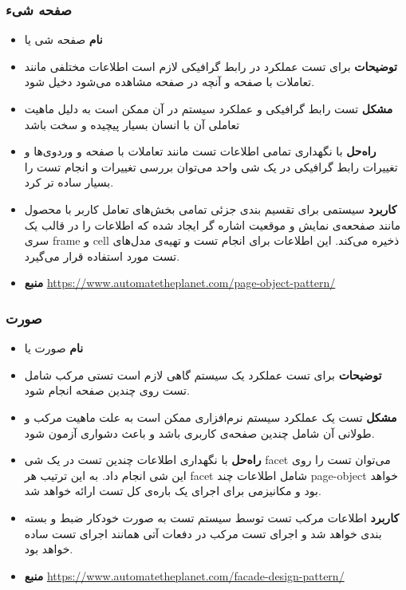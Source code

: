\subsubsection{صفحه شیء}
\begin{itemize}
\item \textbf{نام} \newline
صفحه شی یا 
\item \textbf{توضیحات} \newline
برای تست عملکرد در رابط گرافیکی لازم است اطلاعات مختلفی مانند تعاملات با صفحه و آنچه در صفحه مشاهده می‌شود دخیل شود.
\item \textbf{مشکل} \newline
تست رابط گرافیکی و عملکرد سیستم در آن ممکن است به دلیل ماهیت تعاملی آن با انسان بسیار پیچیده و سخت باشد
\item \textbf{راه‌حل} \newline
با نگهداری تمامی اطلاعات تست مانند تعاملات با صفحه و وردوی‌ها و تغییرات رابط گرافیکی در یک شی واحد می‌توان بررسی تغییرات و انجام تست را بسیار ساده تر کرد.
\item \textbf{کاربرد} \newline
سیستمی برای تقسیم بندی جزئی تمامی بخش‌های تعامل کاربر با محصول مانند صفحعه‌ی نمایش و موقعیت اشاره گر ایجاد شده که اطلاعات را در قالب یک سری frame و cell ذخیره می‌کند. این اطلاعات برای انجام تست و تهیه‌ی مدل‌های تست مورد استفاده قرار می‌گیرد.
\item \textbf{منبع} \newline
\url{https://www.automatetheplanet.com/page-object-pattern/}
\end{itemize}


\subsubsection{صورت}
\begin{itemize}
\item \textbf{نام} \newline
صورت یا 
\item \textbf{توضیحات} \newline
برای تست عملکرد یک سیستم گاهی لازم است تستی مرکب شامل تست روی چندین صفحه انجام شود.
\item \textbf{مشکل} \newline
تست یک عملکرد سیستم نرم‌افزاری ممکن است به علت ماهیت مرکب و طولانی آن شامل چندین صفحه‌ی کاربری باشد و باعث دشواری آزمون شود.
\item \textbf{راه‌حل} \newline
با نگهداری اطلاعات چندین تست در یک شی facet می‌توان تست را روی این شی انجام داد. به این ترتیب هر facet شامل اطلاعات چند page-object خواهد بود و مکانیزمی برای اجرای یک باره‌ی کل تست ارائه خواهد شد.
\item \textbf{کاربرد} \newline
اطلاعات مرکب تست توسط سیستم تست به صورت خودکار ضبط و بسته بندی خواهد شد و اجرای تست مرکب در دفعات آتی همانند اجرای تست ساده خواهد بود. 
\item \textbf{منبع} \newline
\url{https://www.automatetheplanet.com/facade-design-pattern/}
\end{itemize}
